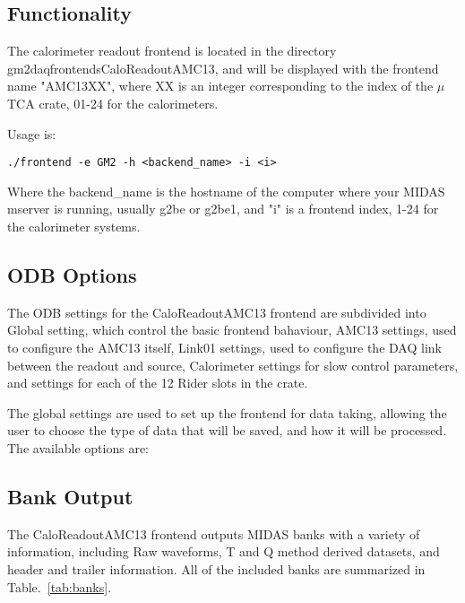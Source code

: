 \subsection{Functionality}

The calorimeter readout frontend is located in the directory gm2daq\/frontends\/CaloReadoutAMC13, and will be displayed with the frontend name "AMC13XX", where XX is an integer corresponding to the index of the $\mu$TCA crate, 01-24 for the calorimeters. 

Usage is:

\begin{verbatim}
./frontend -e GM2 -h <backend_name> -i <i>
\end{verbatim}

Where the backend\_name is the hostname of the computer where your MIDAS mserver is running, usually g2be or g2be1, and "i" is a frontend index, 1-24 for the calorimeter systems.

\subsection{ODB Options}

The ODB settings for the CaloReadoutAMC13 frontend are subdivided into Global setting, which control the basic frontend bahaviour, AMC13 settings, used to configure the AMC13 itself, Link01 settings, used to configure the DAQ link between the readout and source, Calorimeter settings for slow control parameters, and settings for each of the 12 Rider slots in the crate.

The global settings are used to set up the frontend for data taking, allowing the user to choose the type of data that will be saved, and how it will be processed. The available options are:

\subsection{Bank Output}

The CaloReadoutAMC13 frontend outputs MIDAS banks with a variety of information, including Raw waveforms, T and Q method derived datasets, and header and trailer information. All of the included banks are summarized in Table.~\ref{tab:banks}. 

